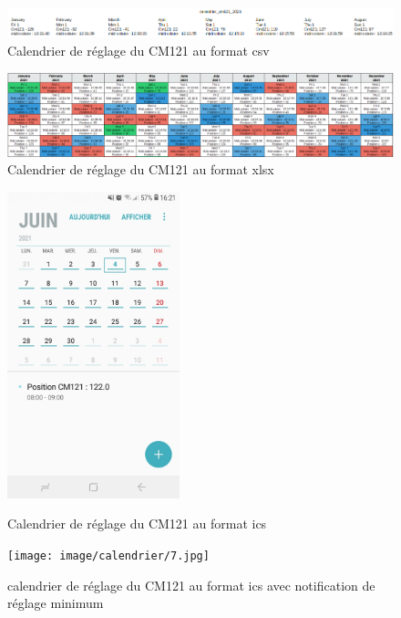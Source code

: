 \documentclass[12pt,a4paper]{article}
\begin{document}
\begin{flushleft}
\begin{figure}[H]
\centering
\includegraphics[width=16cm]{image/calendrier/3.PNG} 
\caption{Calendrier de réglage du CM121 au format csv}  
\end{figure}

\begin{figure}[H]
\centering
\includegraphics[width=16cm]{image/calendrier/2.PNG} 
\caption{Calendrier de réglage du CM121 au format xlsx}  
\end{figure}


\begin{figure}[H]
    \begin{minipage}[c]{.46\linewidth}
        \centering
        \includegraphics[width=5cm]{image/calendrier/4.jpg} 
		\caption{Calendrier de réglage du CM121 au format ics}
    \end{minipage}
    \hfill%
    \begin{minipage}[c]{.46\linewidth}
        \centering
        \texttt{[image: image/calendrier/7.jpg]} 
        \caption{calendrier de réglage du CM121 au format ics avec notification de réglage minimum}
    \end{minipage}
\end{figure}


\end{flushleft}
\end{document}
